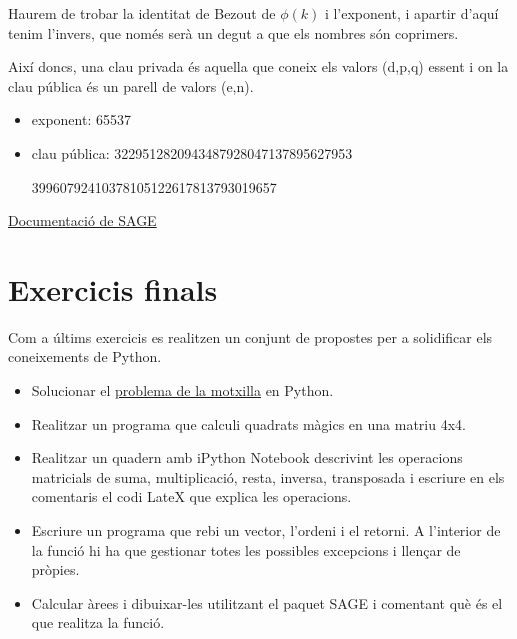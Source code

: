 Haurem de trobar la identitat de Bezout de $\phi(k)$ i l'exponent, i apartir d'aquí tenim l'invers, que només serà un degut a que els nombres són coprimers.

Així doncs, una clau privada és aquella que coneix els valors (d,p,q) essent i on la clau pública és un parell de valors (e,n).

\begin{itemize}
\item exponent: 65537
\item clau pública: 3229512820943487928047137895627953

39960792410378105122617813793019657
\end{itemize}


\href{http://www.sagemath.org/doc/reference/}{Documentació de SAGE}



\newpage
\section*{Exercicis finals}

Com a últims exercicis es realitzen un conjunt de propostes per a solidificar els coneixements de Python.

\begin{itemize}
\item Solucionar el \href{http://ca.wikipedia.org/wiki/Problema_de_la_motxilla}{problema de la motxilla} en Python.
\item Realitzar un programa que calculi quadrats màgics en una matriu 4x4.
\item Realitzar un quadern amb iPython Notebook descrivint les operacions matricials de suma, multiplicació, resta, inversa, transposada i escriure en els comentaris el codi LateX que explica les operacions.
\item Escriure un programa que rebi un vector, l'ordeni i el retorni. A l'interior de la funció hi ha que gestionar totes les possibles excepcions i llençar de pròpies.
\item Calcular àrees i dibuixar-les utilitzant el paquet SAGE i comentant què és el que realitza la funció.
\end{itemize}